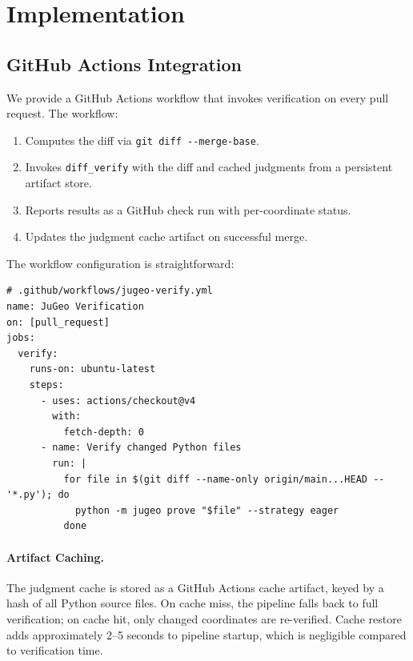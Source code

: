\documentclass[11pt]{article}
\newcommand{\DiffVerif}{\texttt{diff\_verify}}
\begin{document}
\section{Implementation}\label{sec:implementation}

\subsection{GitHub Actions Integration}

We provide a GitHub Actions workflow that invokes \JuGeo{} verification on
every pull request. The workflow:
\begin{enumerate}[leftmargin=*]
  \item Computes the diff via \texttt{git diff \texttt{-{}-}merge-base}.
  \item Invokes \DiffVerif{} with the diff and cached judgments from a
        persistent artifact store.
  \item Reports results as a GitHub check run with per-coordinate status.
  \item Updates the judgment cache artifact on successful merge.
\end{enumerate}

The workflow configuration is straightforward:

\begin{lstlisting}[basicstyle=\small\ttfamily,frame=single,
  xleftmargin=1em,language={}]
# .github/workflows/jugeo-verify.yml
name: JuGeo Verification
on: [pull_request]
jobs:
  verify:
    runs-on: ubuntu-latest
    steps:
      - uses: actions/checkout@v4
        with:
          fetch-depth: 0
      - name: Verify changed Python files
        run: |
          for file in $(git diff --name-only origin/main...HEAD -- '*.py'); do
            python -m jugeo prove "$file" --strategy eager
          done
\end{lstlisting}

\paragraph{Artifact Caching.}
The judgment cache is stored as a GitHub Actions cache artifact, keyed by a
hash of all Python source files. On cache miss, the pipeline falls back to
full verification; on cache hit, only changed coordinates are re-verified.
Cache restore adds approximately 2--5 seconds to pipeline startup, which is
negligible compared to verification time.
\end{document}
